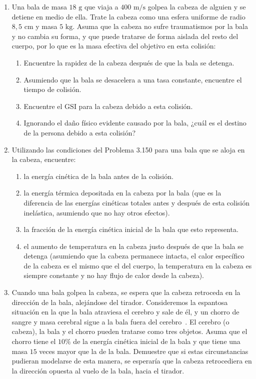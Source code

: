 \documentclass[12pt]{book}
\begin{document}
\begin{enumerate}
\item[3.150] Una bala de masa $18\text{ g}$ que viaja a $400\text{ m/s}$ golpea la cabeza de alguien y se detiene en medio de ella. Trate la cabeza como una esfera uniforme de radio $8{,}5\text{ cm}$ y masa $5\text{ kg}$. Asuma que la cabeza no sufre traumatismos por la bala y no cambia su forma, y que puede tratarse de forma aislada del resto del cuerpo, por lo que es la masa efectiva del objetivo en esta colisión:
\begin{enumerate}
\item[(a)] Encuentre la rapidez de la cabeza después de que la bala se detenga.
\item[(b)] Asumiendo que la bala se desacelera a una tasa constante, encuentre el tiempo de colisión.
\item[(c)] Encuentre el $\text{GSI}$ para la cabeza debido a esta colisión.
\item[(d)] Ignorando el daño físico evidente causado por la bala, ¿cuál es el destino de la persona debido a esta colisión?
\end{enumerate}

\item[3.151] Utilizando las condiciones del Problema 3.150 para una bala que se aloja en la cabeza, encuentre:
\begin{enumerate}
\item[(a)] la energía cinética de la bala antes de la colisión.
\item[(b)] la energía térmica depositada en la cabeza por la bala (que es la diferencia de las energías cinéticas totales antes y después de esta colisión inelástica, asumiendo que no hay otros efectos).
\item[(c)] la fracción de la energía cinética inicial de la bala que esto representa.
\item[(d)] el aumento de temperatura en la cabeza justo después de que la bala se detenga (asumiendo que la cabeza permanece intacta, el calor específico de la cabeza es el mismo que el del cuerpo, la temperatura en la cabeza es siempre constante y no hay flujo de calor desde la cabeza).
\end{enumerate}

\item[3.152] Cuando una bala golpea la cabeza, se espera que la cabeza retroceda en la dirección de la bala, alejándose del tirador. Consideremos la espantosa situación en la que la bala atraviesa el cerebro y sale de él, y un chorro de sangre y masa cerebral sigue a la bala fuera del cerebro~\cite{ref142}. El cerebro (o cabeza), la bala y el chorro pueden tratarse como tres objetos. Asuma que el chorro tiene el $10\%$ de la energía cinética inicial de la bala y que tiene una masa $15$ veces mayor que la de la bala. Demuestre que si estas circunstancias pudieran modelarse de esta manera, se esperaría que la cabeza retrocediera en la dirección opuesta al vuelo de la bala, hacia el tirador.


\end{enumerate}
\end{document}
